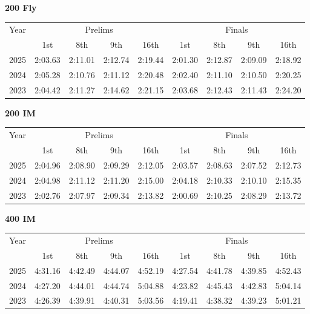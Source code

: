 \textbf{200 Fly}

\begin{flushleft}
\begin{tabular}{|c|c|c|c|c|c|c|c|c|}
\hline
Year & \multicolumn{4}{c|}{Prelims} & \multicolumn{4}{c|}{Finals} \\
\cline{2-9}
& 1st & 8th & 9th & 16th & 1st & 8th & 9th & 16th \\
\hline
2025 & 2:03.63 & 2:11.01 & 2:12.74 & 2:19.44 & 2:01.30 & 2:12.87 & 2:09.09 & 2:18.92 \\
2024 & 2:05.28 & 2:10.76 & 2:11.12 & 2:20.48 & 2:02.40 & 2:11.10 & 2:10.50 & 2:20.25 \\
2023 & 2:04.42 & 2:11.27 & 2:14.62 & 2:21.15 & 2:03.68 & 2:12.43 & 2:11.43 & 2:24.20 \\
\hline
\end{tabular}
\end{flushleft}

\textbf{200 IM}

\begin{flushleft}
\begin{tabular}{|c|c|c|c|c|c|c|c|c|}
\hline
Year & \multicolumn{4}{c|}{Prelims} & \multicolumn{4}{c|}{Finals} \\
\cline{2-9}
& 1st & 8th & 9th & 16th & 1st & 8th & 9th & 16th \\
\hline
2025 & 2:04.96 & 2:08.90 & 2:09.29 & 2:12.05 & 2:03.57 & 2:08.63 & 2:07.52 & 2:12.73 \\
2024 & 2:04.98 & 2:11.12 & 2:11.20 & 2:15.00 & 2:04.18 & 2:10.33 & 2:10.10 & 2:15.35 \\
2023 & 2:02.76 & 2:07.97 & 2:09.34 & 2:13.82 & 2:00.69 & 2:10.25 & 2:08.29 & 2:13.72 \\
\hline
\end{tabular}
\end{flushleft}

\textbf{400 IM}

\begin{flushleft}
\begin{tabular}{|c|c|c|c|c|c|c|c|c|}
\hline
Year & \multicolumn{4}{c|}{Prelims} & \multicolumn{4}{c|}{Finals} \\
\cline{2-9}
& 1st & 8th & 9th & 16th & 1st & 8th & 9th & 16th \\
\hline
2025 & 4:31.16 & 4:42.49 & 4:44.07 & 4:52.19 & 4:27.54 & 4:41.78 & 4:39.85 & 4:52.43 \\
2024 & 4:27.20 & 4:44.01 & 4:44.74 & 5:04.88 & 4:23.82 & 4:45.43 & 4:42.83 & 5:04.14 \\
2023 & 4:26.39 & 4:39.91 & 4:40.31 & 5:03.56 & 4:19.41 & 4:38.32 & 4:39.23 & 5:01.21 \\
\hline
\end{tabular}
\end{flushleft}


